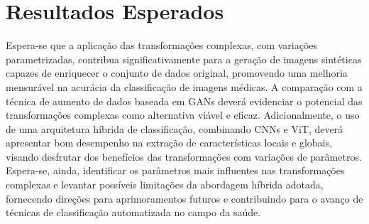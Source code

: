 \section{Resultados Esperados}

Espera-se que a aplicação das transformações complexas, com variações parametrizadas, contribua significativamente para a geração de imagens sintéticas capazes de enriquecer o conjunto de dados original, promovendo uma melhoria mensurável na acurácia da classificação de imagens médicas. A comparação com a técnica de aumento de dados baseada em GANs deverá evidenciar o potencial das transformações complexas como alternativa viável e eficaz. Adicionalmente, o uso de uma arquitetura híbrida de classificação, combinando CNNs e ViT, deverá apresentar bom desempenho na extração de características locais e globais, visando desfrutar dos benefícios das transformações com variações de parâmetros. Espera-se, ainda, identificar os parâmetros mais influentes nas transformações complexas e levantar possíveis limitações da abordagem híbrida adotada, fornecendo direções para aprimoramentos futuros e contribuindo para o avanço de técnicas de classificação automatizada no campo da saúde.
